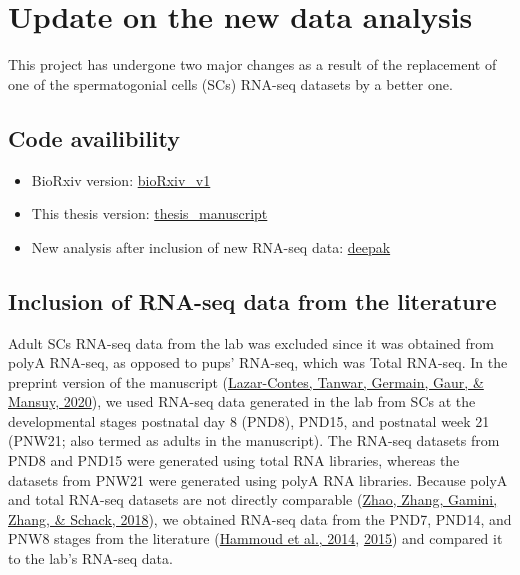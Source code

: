 \documentclass[12pt,twoside]{reedthesis}
\begin{document}
\newpage

\hypertarget{update-on-the-new-data-analysis}{%
\section{Update on the new data analysis}\label{update-on-the-new-data-analysis}}

This project has undergone two major changes as a result of the
replacement of one of the spermatogonial cells (SCs) RNA-seq datasets by
a better one.

\hypertarget{code-availibility}{%
\subsection{Code availibility}\label{code-availibility}}
\begin{itemize}
\item
  BioRxiv version:
  \href{https://github.com/mansuylab/SC_postnatal_adult/tree/bioRxiv_v1}{bioRxiv\_v1}
\item
  This thesis version:
  \href{https://github.com/mansuylab/SC_postnatal_adult/tree/thesis_manuscript}{thesis\_manuscript}
\item
  New analysis after inclusion of new RNA-seq data:
  \href{https://github.com/mansuylab/SC_postnatal_adult/tree/deepak}{deepak}
\end{itemize}
\hypertarget{inclusion-of-rna-seq-data-from-the-literature}{%
\subsection{Inclusion of RNA-seq data from the literature}\label{inclusion-of-rna-seq-data-from-the-literature}}

Adult SCs RNA-seq data from the lab was excluded since it was obtained
from polyA RNA-seq, as opposed to pups' RNA-seq, which was Total
RNA-seq. In the preprint version of the manuscript (\protect\hyperlink{ref-lazarcontes_2020}{Lazar-Contes, Tanwar, Germain, Gaur, \& Mansuy, 2020}),
we used RNA-seq data generated in the lab from SCs at the developmental
stages postnatal day 8 (PND8), PND15, and postnatal week 21 (PNW21; also
termed as adults in the manuscript). The RNA-seq datasets from PND8 and
PND15 were generated using total RNA libraries, whereas the datasets
from PNW21 were generated using polyA RNA libraries. Because polyA and
total RNA-seq datasets are not directly comparable (\protect\hyperlink{ref-zhao_2018}{Zhao, Zhang, Gamini, Zhang, \& Schack, 2018}), we
obtained RNA-seq data from the PND7, PND14, and PNW8 stages from the
literature (\protect\hyperlink{ref-hammoud2014}{Hammoud et al., 2014}, \protect\hyperlink{ref-hammoud2015}{2015}) and compared it to the lab's
RNA-seq data.
\end{document}
